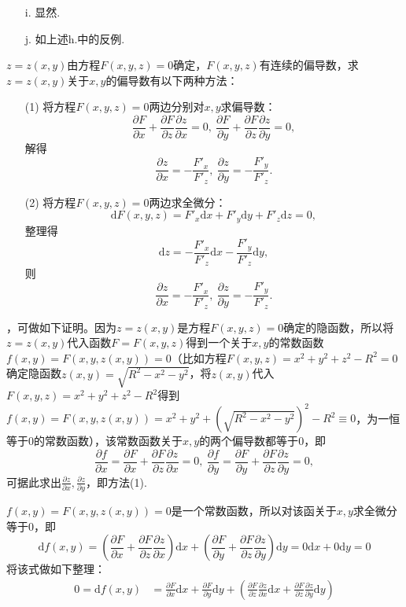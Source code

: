 \documentclass[12pt,UTF8]{ctexart}
\begin{document}
\begin{enumerate}
\begin{enumerate}
\item[i.]显然.
\item[j.]如上述h.中的反例.
\end{enumerate}

$z=z(x,y)$由方程$F(x,y,z)=0$确定，$F(x,y,z)$有连续的偏导数，求$z=z(x,y)$关于$x,y$的偏导数有以下两种方法：
\begin{enumerate}
\item[(1)]将方程$F(x,y,z)=0$两边分别对$x,y$求偏导数：
\[\frac{\partial F}{\partial x}+\frac{\partial F}{\partial z}\frac{\partial z}{\partial x}=0,\ \frac{\partial F}{\partial y}+\frac{\partial F}{\partial z}\frac{\partial z}{\partial y}=0,\]
解得
\[\frac{\partial z}{\partial x}=-\frac{F'_x}{F'_z},\ \frac{\partial z}{\partial y}=-\frac{F'_y}{F'_z}.\]
\item[(2)]将方程$F(x,y,z)=0$两边求全微分：
\[\mathrm dF(x,y,z)=F'_x\mathrm dx+F'_y\mathrm dy+F'_z\mathrm dz=0,\]
整理得
\[\mathrm dz=-\frac{F'_x}{F'_z}\mathrm dx-\frac{F'_y}{F'_z}\mathrm dy,\]
则
\[\frac{\partial z}{\partial x}=-\frac{F'_x}{F'_z},\ \frac{\partial z}{\partial y}=-\frac{F'_y}{F'_z}.\]
\end{enumerate}
\par
{}，可做如下证明。因为$z=z(x,y)$是方程$F(x,y,z)=0$确定的隐函数，所以将$z=z(x,y)$代入函数$F=F(x,y,z)$得到一个关于$x,y$的常数函数$f(x,y)=F(x,y,z(x,y))=0$（比如方程$F(x,y,z)=x^2+y^2+z^2-R^2=0$确定隐函数$z(x,y)=\sqrt{R^2-x^2-y^2}$，将$z(x,y)$代入$F(x,y,z)=x^2+y^2+z^2-R^2$得到$f(x,y)=F(x,y,z(x,y))=x^2+y^2+(\sqrt{R^2-x^2-y^2})^2-R^2\equiv0$，为一恒等于$0$的常数函数），该常数函数关于$x,y$的两个偏导数都等于$0$，即
\[\frac{\partial f}{\partial x}=\frac{\partial F}{\partial x}+\frac{\partial F}{\partial z}\frac{\partial z}{\partial x}=0,\ \frac{\partial f}{\partial y}=\frac{\partial F}{\partial y}+\frac{\partial F}{\partial z}\frac{\partial z}{\partial y}=0,\]
可据此求出$\frac{\partial z}{\partial x},\frac{\partial z}{\partial y}$，即方法(1).
\par
{}$f(x,y)=F(x,y,z(x,y))=0$是一个常数函数，所以对该函关于$x,y$求全微分等于0，即
\[
\mathrm df(x,y)=(\frac{\partial F}{\partial x}+\frac{\partial F}{\partial z}\frac{\partial z}{\partial x})\mathrm dx+(\frac{\partial F}{\partial y}+\frac{\partial F}{\partial z}\frac{\partial z}{\partial y})\mathrm dy=0\mathrm dx+0\mathrm dy=0
\]
将该式做如下整理：
\begin{equation}\label{per-diff}
\begin{split}
0=\mathrm df(x,y)&=\frac{\partial F}{\partial x}\mathrm dx+\frac{\partial F}{\partial y}\mathrm dy+(\frac{\partial F}{\partial z}\frac{\partial z}{\partial x}\mathrm dx+\frac{\partial F}{\partial z}\frac{\partial z}{\partial y}\mathrm dy)\\

\end{split}
\end{equation}
\end{enumerate}
\end{document}
